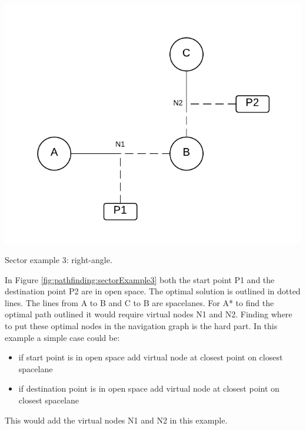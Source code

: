 \begin{marginfigure}
	\includegraphics{res/pathfinding/PathFindingSector3.pdf}
    \caption[Sector example 3: right-angle]{Sector example 3: right-angle.}
	\label{fig:pathfinding:sectorExample3}
\end{marginfigure}
In Figure \ref{fig:pathfinding:sectorExample3} both the start point P1 and the destination point P2 are in open space.
The optimal solution is outlined in dotted lines.
The lines from A to B and C to B are spacelanes.
For A* to find the optimal path outlined it would require virtual nodes N1 and N2.
Finding where to put these optimal nodes in the navigation graph is the hard part.
In this example a simple case could be:
\begin{itemize}
\item if start point is in open space add virtual node at closest point on closest spacelane
\item if destination point is in open space add virtual node at closest point on closest spacelane
\end{itemize}
This would add the virtual nodes N1 and N2 in this example.

